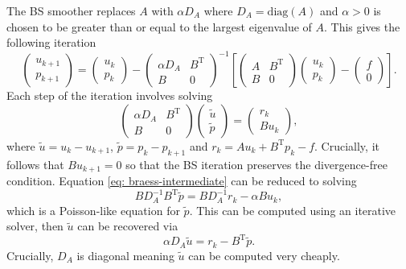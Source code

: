 \documentclass[12pt]{article}
\theoremstyle{theorem}
\begin{document}
The BS smoother replaces $A$ with $\alpha D_A$ where $D_A = \text{diag}(A)$ and $\alpha > 0$ is chosen to be greater than or equal to the largest eigenvalue of $A$. This gives the following iteration
\begin{equation}
    \begin{pmatrix}
        u_{k+1} \\
        p_{k+1}
    \end{pmatrix}
    =
    \begin{pmatrix}
        u_k \\
        p_k
    \end{pmatrix}
    -
    \begin{pmatrix}
        \alpha D_A & B^{\mathrm{T}} \\
        B & 0
    \end{pmatrix}^{-1}
    \left [
        \begin{pmatrix}
            A & B^{\mathrm{T}} \\
            B & 0
        \end{pmatrix}
        \begin{pmatrix}
            u_k \\
            p_k
        \end{pmatrix}
        -
        \begin{pmatrix}
            f \\
            0
        \end{pmatrix}
    \right ].
\end{equation}
Each step of the iteration involves solving
\begin{equation}\label{eq: braess-intermediate}
    \begin{pmatrix}
        \alpha D_A & B^{\mathrm{T}} \\
        B & 0
    \end{pmatrix}
    \begin{pmatrix}
        \tilde{u} \\
        \tilde{p}
    \end{pmatrix}
    =
    \begin{pmatrix}
        r_k \\
        Bu_k
    \end{pmatrix},
\end{equation}
where $\tilde{u} = u_k - u_{k+1}$, $\tilde{p} = p_k - p_{k+1}$ and $r_k = Au_k + B^{\mathrm{T}}p_k - f$. Crucially, it follows that $Bu_{k+1} = 0$ so that the BS iteration preserves the divergence-free condition. Equation \eqref{eq: braess-intermediate} can be reduced to solving
\begin{equation}
    B D_A^{-1} B^{\mathrm{T}}\tilde{p} = BD_A^{-1}r_k - \alpha B u_k,
\end{equation}
which is a Poisson-like equation for $\tilde{p}$. This can be computed using an iterative solver, then $\tilde{u}$ can be recovered via
\begin{equation}
    \alpha D_A\tilde{u} = r_k - B^{\mathrm{T}}\tilde{p}.
\end{equation}
Crucially, $D_A$ is diagonal meaning $\tilde u$ can be computed very cheaply.
\end{document}
